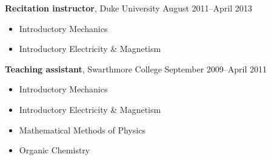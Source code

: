 \documentclass[letterpaper,10pt]{article}
\newcommand{\entry}[3]{\vspace{.5em plus .1em minus .1em}\textbf{#1}, #2 \hfill #3}
\begin{document}
\entry{Recitation instructor}{Duke University}{August 2011--April 2013}

\begin{itemize}
  \item Introductory Mechanics
  \item Introductory Electricity \& Magnetism
\end{itemize}

\entry{Teaching assistant}{Swarthmore College}{September 2009--April 2011}

\begin{itemize}
  \item Introductory Mechanics
  \item Introductory Electricity \& Magnetism
  \item Mathematical Methods of Physics
  \item Organic Chemistry
\end{itemize}
\end{document}
